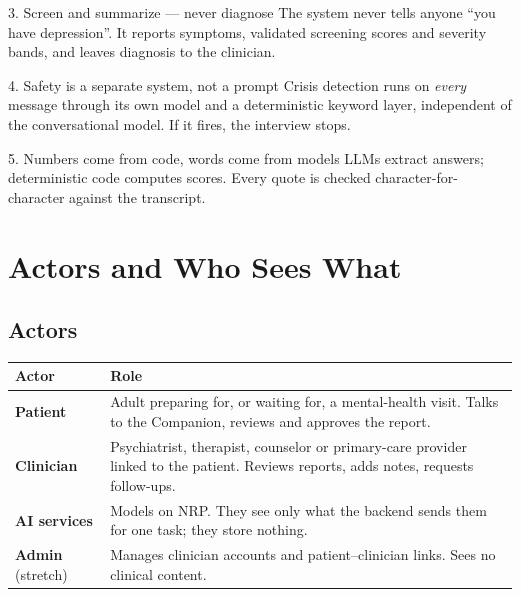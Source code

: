 \documentclass[11pt]{article}
\begin{document}
\begin{principle}{3. Screen and summarize --- never diagnose}
The system never tells anyone ``you have depression''. It reports symptoms, validated screening scores and severity bands,
and leaves diagnosis to the clinician.
\end{principle}

\begin{principle}{4. Safety is a separate system, not a prompt}
Crisis detection runs on \emph{every} message through its own model and a deterministic keyword layer, independent of the
conversational model. If it fires, the interview stops.
\end{principle}

\begin{principle}{5. Numbers come from code, words come from models}
LLMs extract answers; deterministic code computes scores. Every quote is checked character-for-character against the transcript.
\end{principle}

\section{Actors and Who Sees What}
\label{sec:visibility}

\subsection{Actors}
\begin{tabularx}{\textwidth}{@{}l X@{}}
\toprule
\textbf{Actor} & \textbf{Role} \\
\midrule
\textcolor{patient}{\textbf{Patient}} & Adult preparing for, or waiting for, a mental-health visit. Talks to the Companion, reviews and approves the report. \\
\textcolor{clinic}{\textbf{Clinician}} & Psychiatrist, therapist, counselor or primary-care provider linked to the patient. Reviews reports, adds notes, requests follow-ups. \\
\textcolor{model}{\textbf{AI services}} & Models on NRP. They see only what the backend sends them for one task; they store nothing. \\
\textbf{Admin} (stretch) & Manages clinician accounts and patient--clinician links. Sees no clinical content. \\
\bottomrule
\end{tabularx}
\end{document}

